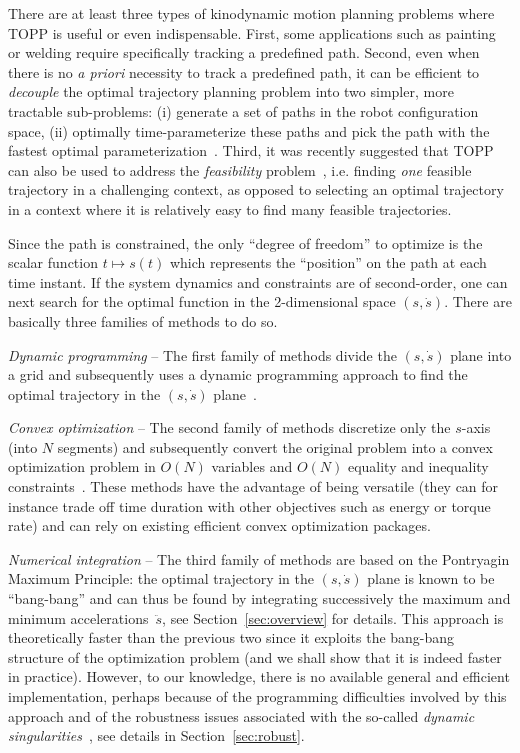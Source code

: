 \documentclass[9pt,technote]{IEEEtran}
\begin{document}
There are at least three types of kinodynamic motion planning problems
where TOPP is useful or even indispensable. First, some applications
such as painting or welding require specifically tracking a predefined
path. Second, even when there is no \emph{a priori} necessity to track
a predefined path, it can be efficient to \emph{decouple} the optimal
trajectory planning problem into two simpler, more tractable
sub-problems: (i) generate a set of paths in the robot configuration
space, (ii) optimally time-parameterize these paths and pick the path
with the fastest optimal
parameterization~\cite{Bob88jra,SD91tra}. Third, it was recently
suggested that TOPP can also be used to address the \emph{feasibility}
problem~\cite{PhaX13rss}, i.e. finding \emph{one} feasible trajectory
in a challenging context, as opposed to selecting an optimal trajectory
in a context where it is relatively easy to find many feasible
trajectories.

Since the path is
constrained, the only ``degree of freedom'' to optimize is the scalar
function $t\mapsto s(t)$ which represents the ``position'' on the path
at each time instant. If the system dynamics and constraints are of
second-order, one can next search for the optimal function in the
2-dimensional space $(s,\dot s)$. There are basically three families
of methods to do so.

\emph{Dynamic programming} -- The first family of methods divide the
$(s,\dot s)$ plane into a grid and subsequently uses a dynamic
programming approach to find the optimal trajectory in the $(s,\dot
s)$ plane~\cite{SM86tac}.

\emph{Convex optimization} -- The second family of methods discretize
only the $s$-axis (into $N$ segments) and subsequently convert the
original problem into a convex optimization problem in $O(N)$
variables and $O(N)$ equality and inequality
constraints~\cite{VerX09tac,Hau13rss,DebX13tr}. These methods have the
advantage of being versatile (they can for instance trade off time
duration with other objectives such as energy or torque rate) and can
rely on existing efficient convex optimization packages.

\emph{Numerical integration} -- The third family of methods are based
on the Pontryagin Maximum Principle: the optimal trajectory in the
$(s,\dot s)$ plane is known to be ``bang-bang'' and can thus be found
by integrating successively the maximum and minimum
accelerations~$\ddot s$, see Section~\ref{sec:overview} for
details. This approach is theoretically faster than the previous two
since it exploits the bang-bang structure of the optimization problem
(and we shall show that it is indeed faster in practice). However, to
our knowledge, there is no available general and efficient
implementation, perhaps because of the programming difficulties
involved by this approach and of the robustness issues associated with
the so-called \emph{dynamic
  singularities}~\cite{SL92jdsmc,KS12rss,Pha13iros}, see details in
Section~\ref{sec:robust}.
\end{document}
